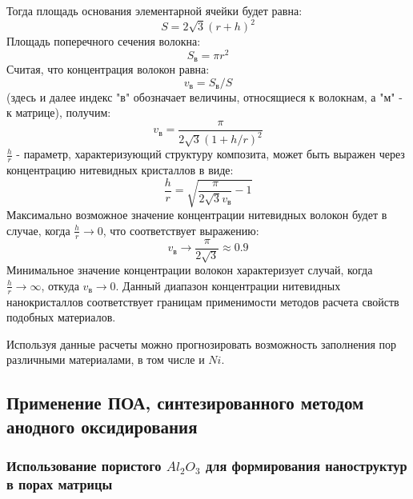 Тогда площадь основания элементарной ячейки будет равна:
\begin{equation}
S=2\sqrt{3}(r+h)^2    
\end{equation}
Площадь поперечного сечения волокна:
\begin{equation}
S_в=\pi r^2    
\end{equation}
Считая, что концентрация волокон равна:
\begin{equation}
v_\text{в}=S_\text{в}/S
\end{equation}
(здесь и далее индекс "$\text{в}$" обозначает величины, относящиеся к волокнам, а "$\text{м}$" - к матрице), получим:
\begin{equation}
v_\text{в}=\frac{\pi}{2\sqrt3(1+h/r)^2}  
\end{equation}
$\frac{h}{r}$ - параметр, характеризующий структуру композита, может быть выражен через концентрацию нитевидных кристаллов в виде:
\begin{equation}
\frac{h}{r}=\sqrt{\frac{\pi}{2\sqrt{3}v_\text{в}}-1}
\end{equation}
Максимально возможное значение концентрации нитевидных волокон будет в случае, когда $\frac{h}{r}\to0$, что соответствует выражению:
\begin{equation}
  v_\text{в}\to\frac{\pi}{2\sqrt{3}}\approx0.9  
\end{equation}
Минимальное значение концентрации волокон характеризует случай, когда $\frac{h}{r}\to\infty$, откуда $v_\text{в}\to0$. Данный диапазон концентрации нитевидных нанокристаллов соответствует границам применимости методов расчета свойств подобных материалов.

Используя данные расчеты можно прогнозировать возможность заполнения пор различными материалами, в том числе и $Ni$.

\subsection{Применение ПОА, синтезированного методом анодного оксидирования}

\subsubsection{Использование пористого $Al_2O_3$ для формирования наноструктур в порах матрицы}


